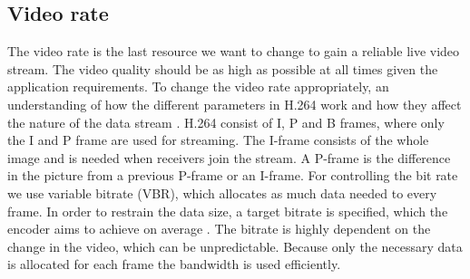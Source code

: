 \subsection{Video rate}
The video rate is the last resource we want to change to gain a reliable live video stream. The video quality should be as high as possible at all times given the application requirements. To change the video rate appropriately, an understanding of how the different parameters in H.264 work and how they affect the nature of the data stream \cite{WorksheetH264}.
H.264 consist of I, P and B frames, where only the I and P frame are used for streaming. The I-frame consists of the whole image and is needed when receivers join the stream. A P-frame is the difference in the picture from a previous P-frame or an I-frame.
For controlling the bit rate we use variable bitrate (VBR), which allocates as much data needed to every frame. In order to restrain the data size, a target bitrate is specified, which the encoder aims to achieve on average \cite{WorksheetH264}. The bitrate is highly dependent on the change in the video, which can be unpredictable. Because only the necessary data is allocated for each frame the bandwidth is used efficiently.
